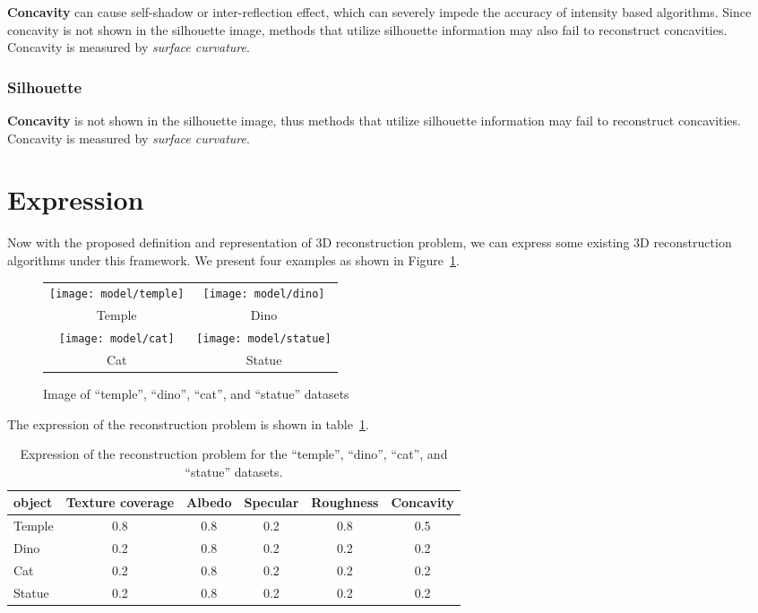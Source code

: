 
\textbf{Concavity} can cause self-shadow or inter-reflection effect, which can severely impede the accuracy of intensity based algorithms. Since concavity is not shown in the silhouette image, methods that utilize silhouette information may also fail to reconstruct concavities. Concavity is measured by \textit{surface curvature}.

\subsubsection{Silhouette}
\textbf{Concavity} is not shown in the silhouette image, thus methods that utilize silhouette information may fail to reconstruct concavities. Concavity is measured by \textit{surface curvature}.

\section{Expression}
\label{sec:3DRecon_Exp}
Now with the proposed definition and representation of 3D reconstruction problem, we can express some existing 3D reconstruction algorithms under this framework. We present four examples as shown in Figure~\ref{fig:express}.
\begin{figure}[h]
\centering
\begin{tabular}{cc}
\texttt{[image: model/temple]}&
\texttt{[image: model/dino]}\\
Temple & Dino\\
\texttt{[image: model/cat]}&
\texttt{[image: model/statue]}\\
Cat & Statue\\
\end{tabular}
\caption{Image of ``temple'', ``dino'', ``cat'', and ``statue'' datasets}
\label{fig:express}
\end{figure}

The expression of the reconstruction problem is shown in table~\ref{tab:express}.
\begin{table}[h]
  \centering
  \begin{tabular}{l*{5}{c}}
  \hline
  \textbf{object} & Texture coverage & Albedo & Specular & Roughness & Concavity\\
  \hline
  Temple & 0.8 & 0.8 & 0.2 & 0.8 & 0.5\\
  Dino & 0.2 & 0.8 & 0.2 & 0.2 & 0.2\\
  Cat & 0.2 & 0.8 & 0.2 & 0.2 & 0.2\\
  Statue & 0.2 & 0.8 & 0.2 & 0.2 & 0.2\\
  \hline
  \end{tabular}
  \caption{Expression of the reconstruction problem for the ``temple'', ``dino'', ``cat'', and ``statue'' datasets.}
  \label{tab:express}
\end{table}